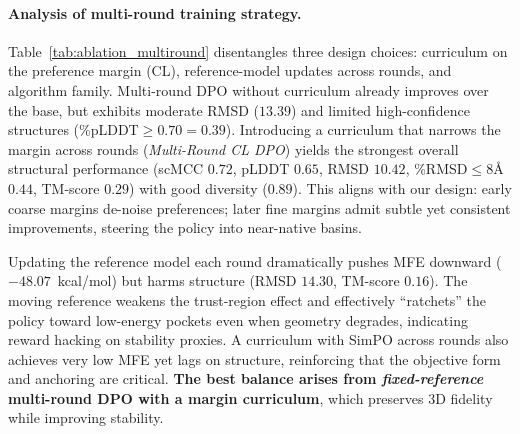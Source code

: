 \paragraph{Analysis of multi-round training strategy.}
Table~\ref{tab:ablation_multiround} disentangles three design choices: curriculum on the preference margin (CL), reference-model updates across rounds, and algorithm family. Multi-round DPO without curriculum already improves over the base, but exhibits moderate RMSD ($13.39$) and limited high-confidence structures (\%pLDDT$\geq 0.70{=}0.39$). Introducing a curriculum that narrows the margin across rounds (\emph{Multi-Round CL DPO}) yields the strongest overall structural performance (scMCC $0.72$, pLDDT $0.65$, RMSD $10.42$, \%RMSD$\leq 8$\AA\ $0.44$, TM-score $0.29$) with good diversity ($0.89$). This aligns with our design: early coarse margins de-noise preferences; later fine margins admit subtle yet consistent improvements, steering the policy into near-native basins. 

Updating the reference model each round dramatically pushes MFE downward ($-48.07$~kcal/mol) but harms structure (RMSD $14.30$, TM-score $0.16$). The moving reference weakens the trust-region effect and effectively “ratchets” the policy toward low-energy pockets even when geometry degrades, indicating reward hacking on stability proxies. A curriculum with SimPO across rounds also achieves very low MFE yet lags on structure, reinforcing that the objective form and anchoring are critical. \textbf{The best balance arises from \emph{fixed-reference} multi-round DPO with a margin curriculum}, which preserves 3D fidelity while improving stability.

